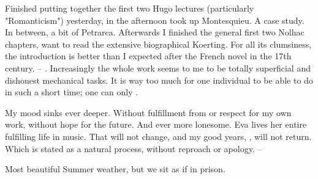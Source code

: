 
Finished putting together the first two Hugo lectures (particularly "Romanticism") yesterday, in the afternoon took up Montesquieu. A case study. In between, a bit of Petrarca. Afterwards I finished the general first two Nolhac chapters, want to read the extensive biographical Koerting. For all its clumsiness, the introduction is better than I expected after the French novel in the 17th century. -- . Increasingly the whole work seems to me to be totally superficial and dishonest mechanical tasks. It is way too much for one individual to be able to do in such a short time; one can only .

My mood sinks ever deeper. Without fulfillment from or respect for my own work, without hope for the future. And ever more lonesome. Eva lives her entire fulfilling life in music. That will not change, and my good years, , will not return. Which is stated as a natural process, without reproach or apology. --

\missing

Most beautiful Summer weather, but we sit as if in prison.

